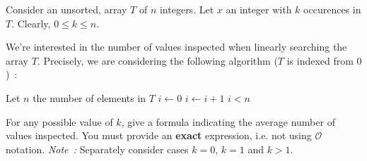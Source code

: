 \documentclass[12pt,addpoints]{exam}
\newcommand{\bigo}{\mathcal{O}}
\begin{document}
\begin{questions}
\question
Consider an unsorted, array $T$ of $n$ integers. Let $x$ an integer with $k$ occurences in $T$. Clearly, $0 \leq k \leq n$.

We're interested in the number of values inspected when linearly searching the array $T$. Precisely, we are considering the following algorithm ($T$ is indexed from $0$)~:
\begin{algorithmic}[1]
    \State Let $n$ the number of elements in $T$
    \State $i \gets 0$
      \State $i \gets i + 1$
    \EndWhile
    \State \Return $i < n$
  \EndFunction
\end{algorithmic}
For any possible value of $k$, give a formula indicating the average number of values inspected.
You must provide an \textbf{exact} expression, i.e. not using $\bigo$ notation.
\emph{Note~:} Separately consider cases $k = 0$, $k = 1$ and $k > 1$.

\end{questions}
\end{document}
